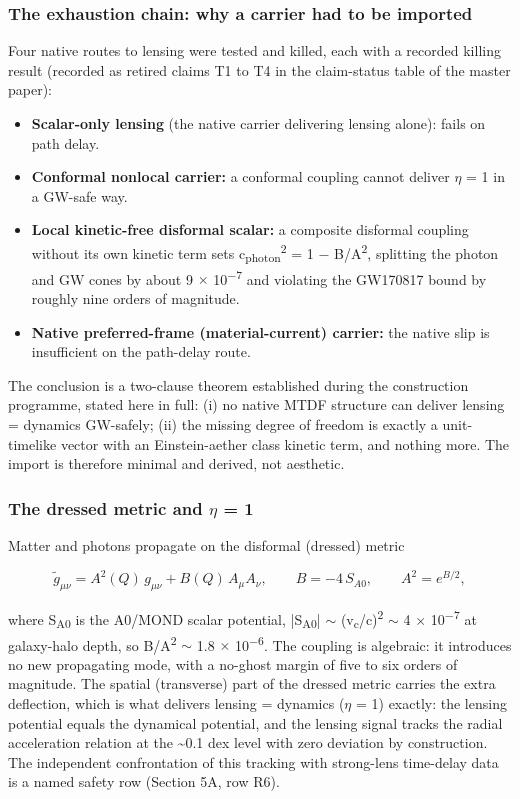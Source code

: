 \documentclass[11pt,a4paper]{article}
\begin{document}
\subsubsection{The exhaustion chain: why a carrier had to be imported}
Four native routes to lensing were tested and killed, each with a recorded killing result (recorded as retired claims T1 to T4 in the claim-status table of the master paper):

\begin{itemize}
  \item \textbf{Scalar-only lensing} (the native carrier delivering lensing alone): fails on path delay.
  \item \textbf{Conformal nonlocal carrier:} a conformal coupling cannot deliver $\eta$ = 1 in a GW-safe way.
  \item \textbf{Local kinetic-free disformal scalar:} a composite disformal coupling without its own kinetic term sets c\textsubscript{photon}\textsuperscript{2} = 1 $-$ B/\allowbreak{}A\textsuperscript{2}, splitting the photon and GW cones by about 9 $\times$ 10\textsuperscript{$-$7} and violating the GW170817 bound by roughly nine orders of magnitude.
  \item \textbf{Native preferred-frame (material-current) carrier:} the native slip is insufficient on the path-delay route.
\end{itemize}

The conclusion is a two-clause theorem established during the construction programme, stated here in full: (i) no native MTDF structure can deliver lensing = dynamics GW-safely; (ii) the missing degree of freedom is exactly a unit-timelike vector with an Einstein-aether class kinetic term, and nothing more. The import is therefore minimal and derived, not aesthetic.

\subsubsection{The dressed metric and $\eta$ = 1}
Matter and photons propagate on the disformal (dressed) metric

\[ \tilde{g}_{\mu\nu} = A^2(Q)\, g_{\mu\nu} + B(Q)\, A_\mu A_\nu , \qquad B = -4\,S_{A0}, \qquad A^2 = e^{B/2}, \]

where S\textsubscript{A0} is the A0/\allowbreak{}MOND scalar potential, |S\textsubscript{A0}| $\sim$ (v\textsubscript{c}/\allowbreak{}c)\textsuperscript{2} $\sim$ 4 $\times$ 10\textsuperscript{$-$7} at galaxy-halo depth, so B/\allowbreak{}A\textsuperscript{2} $\sim$ 1.8 $\times$ 10\textsuperscript{$-$6}. The coupling is algebraic: it introduces no new propagating mode, with a no-ghost margin of five to six orders of magnitude. The spatial (transverse) part of the dressed metric carries the extra deflection, which is what delivers lensing = dynamics ($\eta$ = 1) exactly: the lensing potential equals the dynamical potential, and the lensing signal tracks the radial acceleration relation at the \~{}0.1 dex level with zero deviation by construction. The independent confrontation of this tracking with strong-lens time-delay data is a named safety row (Section 5A, row R6).
\end{document}
